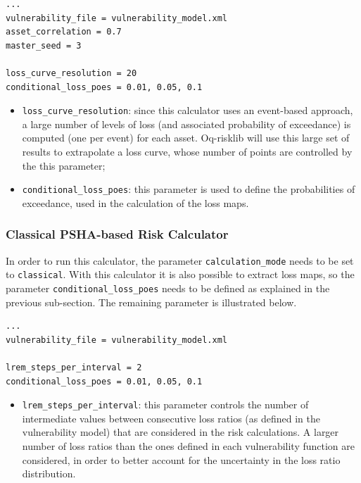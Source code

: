 \begin{Verbatim}[frame=single, commandchars=\\\{\}, samepage=true]
...
vulnerability_file = vulnerability_model.xml
asset_correlation = 0.7
master_seed = 3

loss_curve_resolution = 20
conditional_loss_poes = 0.01, 0.05, 0.1
\end{Verbatim}

\begin{itemize}
\item  \Verb+loss_curve_resolution+: since this calculator uses an event-based approach, a large number of levels of loss (and associated probability of exceedance) is computed (one per event) for each asset. Oq-risklib will use this large set of results to extrapolate a loss curve, whose number of points are controlled by the this parameter;
\item  \Verb+conditional_loss_poes+: this parameter is used to define the probabilities of exceedance, used in the calculation of the loss maps.
\end{itemize}

\subsubsection{Classical PSHA-based Risk Calculator}
In order to run this calculator, the parameter \Verb+calculation_mode+ needs to be set to \Verb+classical+. With this calculator it is also possible to extract loss maps, so the parameter \Verb+conditional_loss_poes+ needs to be defined as explained in the previous sub-section. The remaining parameter is illustrated below.
\begin{Verbatim}[frame=single, commandchars=\\\{\}, samepage=true]
...
vulnerability_file = vulnerability_model.xml

lrem_steps_per_interval = 2
conditional_loss_poes = 0.01, 0.05, 0.1
\end{Verbatim}

\begin{itemize}
\item  \Verb+lrem_steps_per_interval+: this parameter controls the number of intermediate values between consecutive loss ratios (as defined in the vulnerability model) that are considered in the risk calculations. A larger number of loss ratios than the ones defined in each vulnerability function are considered, in order to better account for the uncertainty in the loss ratio distribution.  
\end{itemize}

